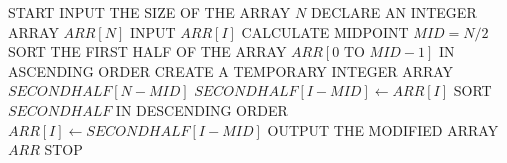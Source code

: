 \begin{algorithm}[H]
\caption{Half Sort Array (First Half Ascending, Second Half Descending)}
\begin{algorithmic}[1]
\STATE START
\STATE INPUT THE SIZE OF THE ARRAY $N$
\STATE DECLARE AN INTEGER ARRAY $ARR[N]$
    \STATE INPUT $ARR[I]$
\ENDFOR
\STATE CALCULATE MIDPOINT $MID = N / 2$
\STATE SORT THE FIRST HALF OF THE ARRAY $ARR[0 \text{ TO } MID - 1]$ IN ASCENDING ORDER
\STATE CREATE A TEMPORARY INTEGER ARRAY $SECONDHALF[N - MID]$
    \STATE $SECONDHALF[I - MID] \gets ARR[I]$
\ENDFOR
\STATE SORT $SECONDHALF$ IN DESCENDING ORDER
    \STATE $ARR[I] \gets SECONDHALF[I - MID]$
\ENDFOR
\STATE OUTPUT THE MODIFIED ARRAY $ARR$
\STATE STOP
\end{algorithmic}
\end{algorithm}
